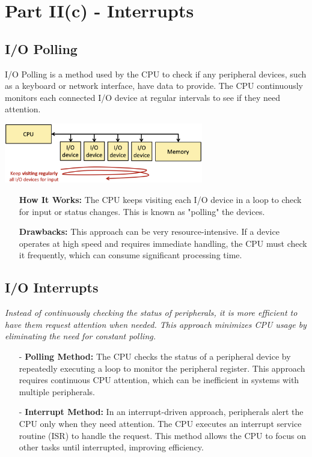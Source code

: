 \chapter{Part II(c) - Interrupts}

\section{I/O Polling}

I/O Polling is a method used by the CPU to check if any peripheral devices, such as a keyboard or network interface, have data to provide. The CPU continuously monitors each connected I/O device at regular intervals to see if they need attention.
\begin{center}
    \includegraphics[width=0.65\textwidth]{chapters/chapter2c/images/IOP.png}
\end{center}
\begin{itemize}
    \item[] \textbf{How It Works:} The CPU keeps visiting each I/O device in a loop to check for input or status changes. This is known as "polling" the devices.
    \item[] \textbf{Drawbacks:} This approach can be very resource-intensive. If a device operates at high speed and requires immediate handling, the CPU must check it frequently, which can consume significant processing time.
\end{itemize}

\section{I/O Interrupts}
\textit{Instead of continuously checking the status of peripherals, it is more efficient to have them \textit{request attention} when needed. This approach minimizes CPU usage by eliminating the need for constant polling.}
\begin{itemize}
    \item[-] \textbf{Polling Method:} The CPU checks the status of a peripheral device by repeatedly executing a loop to monitor the peripheral register. This approach requires continuous CPU attention, which can be inefficient in systems with multiple peripherals. \\
    \item[-] \textbf{Interrupt Method:} In an interrupt-driven approach, peripherals alert the CPU only when they need attention. The CPU executes an interrupt service routine (ISR) to handle the request. This method allows the CPU to focus on other tasks until interrupted, improving efficiency.
\end{itemize}


